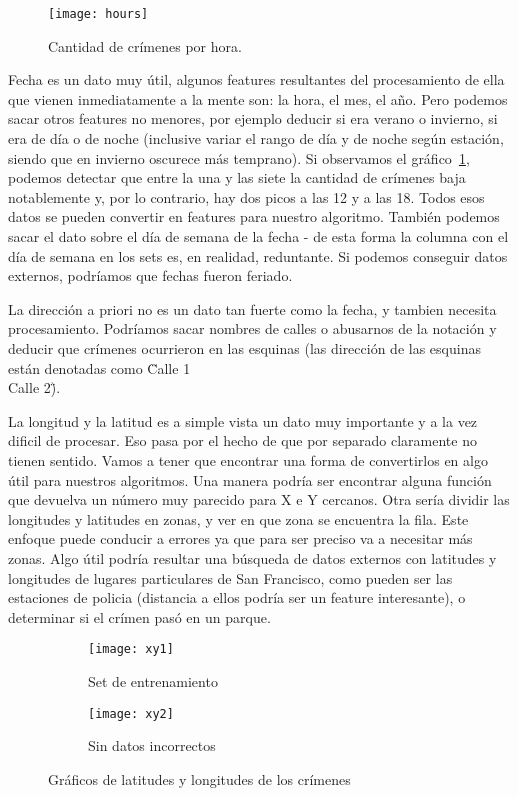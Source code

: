 \begin{figure}[H]
\texttt{[image: hours]}
\caption{Cantidad de crímenes por hora.}
\label{fig:hours}
\end{figure}

Fecha es un dato muy útil, algunos features resultantes del procesamiento de ella que vienen inmediatamente a la mente son: la hora, el mes, el año. Pero podemos sacar otros features no menores, por ejemplo deducir si era verano o invierno, si era de día o de noche (inclusive variar el rango de día y de noche según estación, siendo que en invierno oscurece más temprano). Si observamos el gráfico~\ref{fig:hours}, podemos detectar que entre la una y las siete la cantidad de crímenes baja notablemente y, por lo contrario, hay dos picos a las 12 y a las 18. Todos esos datos se pueden convertir en features para nuestro algoritmo. También podemos sacar el dato sobre el día de semana de la fecha - de esta forma la columna con el día de semana en los sets es, en realidad, reduntante. Si podemos conseguir datos externos, podríamos que fechas fueron feriado.

La dirección a priori no es un dato tan fuerte como la fecha, y tambien necesita procesamiento. Podríamos sacar nombres de calles o abusarnos de la notación y deducir que crímenes ocurrieron en las esquinas (las dirección de las esquinas están denotadas como \"Calle 1 \\ Calle 2\").

La longitud y la latitud es a simple vista un dato muy importante y a la vez dificil de procesar. Eso pasa por el hecho de que por separado claramente no tienen sentido. Vamos a tener que encontrar una forma de convertirlos en algo útil para nuestros algoritmos. Una manera podría ser encontrar alguna función que devuelva un número muy parecido para X e Y cercanos. Otra sería dividir las longitudes y latitudes en zonas, y ver en que zona se encuentra la fila. Este enfoque puede conducir a errores ya que para ser preciso va a necesitar más zonas. Algo útil podría resultar una búsqueda de datos externos con latitudes y longitudes de lugares particulares de San Francisco, como pueden ser las estaciones de policia (distancia a ellos podría ser un feature interesante), o determinar si el crímen pasó en un parque.

\begin{figure}[H]
\centering
\begin{subfigure}{.5\textwidth}
  \centering
  \texttt{[image: xy1]}
  \caption{Set de entrenamiento}
  \label{fig:xy1}
\end{subfigure}%
\begin{subfigure}{.5\textwidth}
  \centering
  \texttt{[image: xy2]}
  \caption{Sin datos incorrectos}
  \label{fig:xy2}
\end{subfigure}
\caption{Gráficos de latitudes y longitudes de los crímenes}
\label{fig:xy}
\end{figure}

